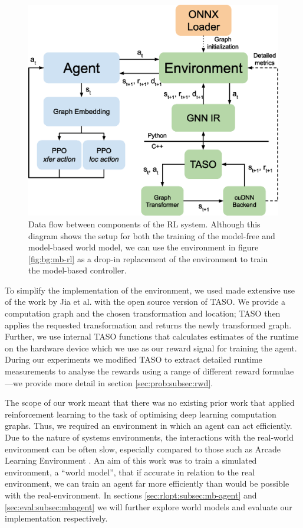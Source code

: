 \begin{figure}[ht]
  \centering
  \includegraphics[width=0.75\columnwidth]{sections/3problem/images/sysenv}
  \caption[RL system environment]{Data flow between components of the RL system. Although this diagram shows the setup for both the training of the model-free and model-based world model, we can use the environment in figure \ref{fig:bg:mb-rl} as a drop-in replacement of the environment to train the model-based controller.}
  \label{fig:problem:sys-env}
\end{figure}

To simplify the implementation of the environment, we used made extensive use of the work by Jia et al. \cite{jia2019taso} with the open source version of TASO. We provide a computation graph and the chosen transformation and location; TASO then applies the requested transformation and returns the newly transformed graph. Further, we use internal TASO functions that calculates estimates of the runtime on the hardware device which we use as our reward signal for training the agent. During our experiments we modified TASO to extract detailed runtime measurements to analyse the rewards using a range of different reward formulae---we provide more detail in section \ref{sec:prob:subsec:rwd}.

The scope of our work meant that there was no existing prior work that applied reinforcement learning to the task of optimising deep learning computation graphs. Thus, we required an environment in which an agent can act efficiently. Due to the nature of systems environments, the interactions with the real-world environment can be often slow, especially compared to those such as Arcade Learning Environment \cite{Bellemare_2013}. An aim of this work was to train a simulated environment, a ``world model'', that if accurate in relation to the real environment, we can train an agent far more efficiently than would be possible with the real-environment. In sections \ref{sec:rlopt:subsec:mb-agent} and \ref{sec:eval:subsec:mbagent} we will further explore world models and evaluate our implementation respectively.

